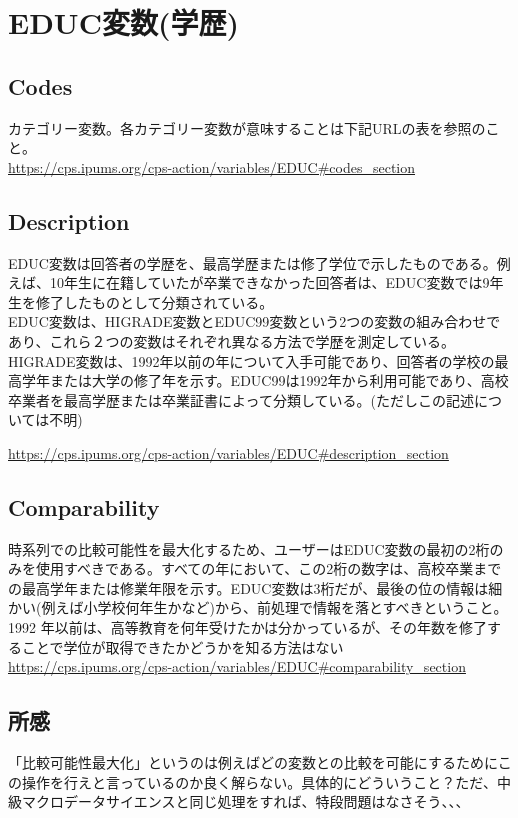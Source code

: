 \documentclass{jsarticle}
\begin{document}
\section{EDUC変数(学歴)}

\subsection{Codes}
カテゴリー変数。各カテゴリー変数が意味することは下記URLの表を参照のこと。\\
\url{https://cps.ipums.org/cps-action/variables/EDUC#codes_section}

\subsection{Description}
EDUC変数は回答者の学歴を、最高学歴または修了学位で示したものである。例えば、10年生に在籍していたが卒業できなかった回答者は、EDUC変数では9年生を修了したものとして分類されている。\\
  
EDUC変数は、HIGRADE変数とEDUC99変数という2つの変数の組み合わせであり、これら２つの変数はそれぞれ異なる方法で学歴を測定している。HIGRADE変数は、1992年以前の年について入手可能であり、回答者の学校の最高学年または大学の修了年を示す。EDUC99は1992年から利用可能であり、高校卒業者を最高学歴または卒業証書によって分類している。(ただしこの記述については不明)

\url{https://cps.ipums.org/cps-action/variables/EDUC#description_section}

\subsection{Comparability}
時系列での比較可能性を最大化するため、ユーザーはEDUC変数の最初の2桁のみを使用すべきである。すべての年において、この2桁の数字は、高校卒業までの最高学年または修業年限を示す。EDUC変数は3桁だが、最後の位の情報は細かい(例えば小学校何年生かなど)から、前処理で情報を落とすべきということ。1992 年以前は、高等教育を何年受けたかは分かっているが、その年数を修了することで学位が取得できたかどうかを知る方法はない\\
\url{https://cps.ipums.org/cps-action/variables/EDUC#comparability_section}

\subsection{所感}
「比較可能性最大化」というのは例えばどの変数との比較を可能にするためにこの操作を行えと言っているのか良く解らない。具体的にどういうこと？ただ、中級マクロデータサイエンスと同じ処理をすれば、特段問題はなさそう、、、
\end{document}
